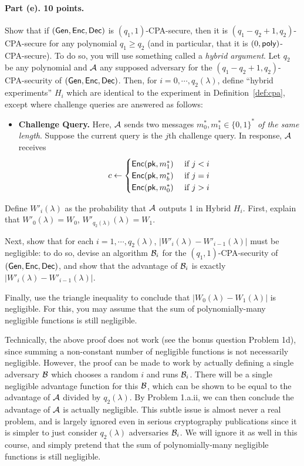 \documentclass{article}
\begin{document}
\paragraph{Part (e). 10 points.} Show that if $({\sf Gen},{\sf Enc},{\sf Dec})$ is $(q_1,1)$-CPA-secure, then it is $(q_1-q_2+1,q_2)$-CPA-secure for any polynomial $q_1\geq q_2$ (and in particular, that it is $(0,{\sf poly})$-CPA-secure). To do so, you will use something called a \emph{hybrid argument}. Let $q_2$ be any polynomial and ${\mathcal{A}}$ any supposed adversary for the $(q_1-q_2+1,q_2)$-CPA-security of $({\sf Gen},{\sf Enc},{\sf Dec})$.  Then, for $i=0,\cdots,q_2(\lambda)$, define ``hybrid experiments'' $H_i$ which are identical to the experiment in Definition~\ref{def:cpa}, except where challenge queries are answered as follows:
\begin{itemize}
    \item {\bf Challenge Query.} Here, ${\mathcal{A}}$ sends two messages $m_0^*,m_1^*\in\{0,1\}^*$ \emph{of the same length}. Suppose the current query is the $j$th challenge query. In response, ${\mathcal{A}}$ receives 
    \[c\gets\begin{cases}
        {\sf Enc}({\sf pk},m_1^*)&\text{ if }j<i\\
        {\sf Enc}({\sf pk},m_b^*)&\text{ if }j=i\\
        {\sf Enc}({\sf pk},m_0^*)&\text{ if }j>i\end{cases}\]
\end{itemize}
Define $W'_i(\lambda)$ as the probability that ${\mathcal{A}}$ outputs 1 in Hybrid $H_i$. First, explain that $W'_0(\lambda)=W_0$, $W'_{q_2(\lambda)}(\lambda)=W_1$. 

Next, show that for each $i=1,\cdots,q_2(\lambda)$, $|W'_i(\lambda)-W'_{i-1}(\lambda)|$ must be negligible: to do so, devise an algorithm ${\mathcal{B}}_i$ for the $(q_1,1)$-CPA-security of $({\sf Gen},{\sf Enc},{\sf Dec})$, and show that the advantage of ${\mathcal{B}}_i$ is exactly $|W'_i(\lambda)-W'_{i-1}(\lambda)|$.

Finally, use the triangle inequality to conclude that $|W_0(\lambda)-W_1(\lambda)|$ is negligible. For this, you may assume that the sum of polynomially-many negligible functions is still negligible.

\begin{remark}Technically, the above proof does not work (see the bonus question Problem 1d), since summing a non-constant number of negligible functions is not necessarily negligible. However, the proof can be made to work by actually defining a single adversary ${\mathcal{B}}$ which chooses a random $i$ and runs ${\mathcal{B}}_i$. There will be a single negligible advantage function for this ${\mathcal{B}}$, which can be shown to be equal to the advantage of ${\mathcal{A}}$ divided by $q_2(\lambda)$. By Problem 1.a.ii, we can then conclude the advantage of ${\mathcal{A}}$ is actually negligible. This subtle issue is almost never a real problem, and is largely ignored even in serious cryptography publications since it is simpler to just consider $q_2(\lambda)$ adversaries ${\mathcal{B}}_i$. We will ignore it as well in this course, and simply pretend that the sum of polynomially-many negligible functions is still negligible.
\end{remark}
\end{document}
